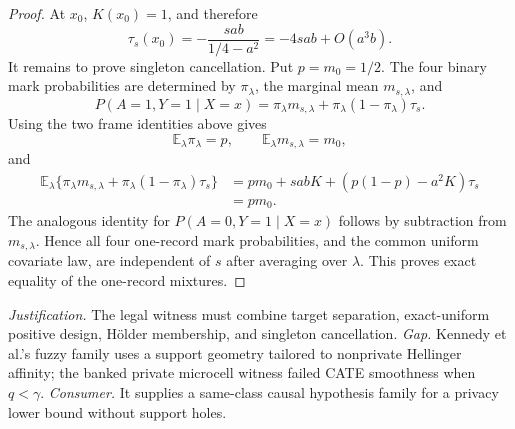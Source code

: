 \documentclass{article}
\begin{document}
\begin{proof}
At \(x_0\), \(K(x_0)=1\), and therefore
\[
 \tau_s(x_0)=-\frac{sab}{1/4-a^2}=-4sab+O(a^3b).
\]
It remains to prove singleton cancellation.  Put \(p=m_0=1/2\).  The four binary mark probabilities are determined by \(\pi_\lambda\), the marginal mean \(m_{s,\lambda}\), and
\[
 P(A=1,Y=1\mid X=x)
 =\pi_\lambda m_{s,\lambda}
   +\pi_\lambda(1-\pi_\lambda)\tau_s.
\]
Using the two frame identities above gives
\[
 \mathbb E_\lambda\pi_\lambda=p,
 \qquad \mathbb E_\lambda m_{s,\lambda}=m_0,
\]
and
\[
 \begin{aligned}
 \mathbb E_\lambda\{\pi_\lambda m_{s,\lambda}
 +\pi_\lambda(1-\pi_\lambda)\tau_s\}
 &=pm_0+sabK+(p(1-p)-a^2K)\tau_s\\
 &=pm_0.
 \end{aligned}
\]
The analogous identity for \(P(A=0,Y=1\mid X=x)\) follows by subtraction from \(m_{s,\lambda}\).  Hence all four one-record mark probabilities, and the common uniform covariate law, are independent of \(s\) after averaging over \(\lambda\).  This proves exact equality of the one-record mixtures.
\end{proof}
\par\smallskip\noindent \textit{Justification.} The legal witness must combine target separation, exact-uniform positive design, Hölder membership, and singleton cancellation. \textit{Gap.} Kennedy et al.'s fuzzy family uses a support geometry tailored to nonprivate Hellinger affinity; the banked private microcell witness failed CATE smoothness when \(q<\gamma\). \textit{Consumer.} It supplies a same-class causal hypothesis family for a privacy lower bound without support holes.
\end{document}
